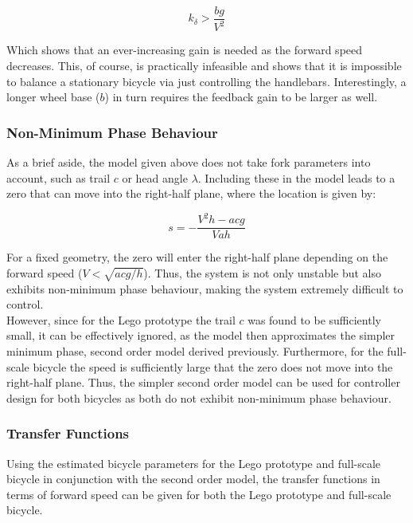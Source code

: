 \begin{equation}
k_{\delta} > \frac{b g}{V^2}
\label{eq:minGain}
\end{equation}

Which shows that an ever-increasing gain is needed as the forward speed decreases. This, of course, is practically infeasible and shows that it is impossible to balance a stationary bicycle via just controlling the handlebars. Interestingly, a longer wheel base ($b$) in turn requires the feedback gain to be larger as well.

\subsubsection{Non-Minimum Phase Behaviour}
As a brief aside, the model given above does not take fork parameters into account, such as trail $c$ or head angle $\lambda$. Including these in the model leads to a zero that can move into the right-half plane, where the location is given by:

\begin{equation*}
s = - \frac{V^2h-acg}{Vah}
\end{equation*}

For a fixed geometry, the zero will enter the right-half plane depending on the forward speed ($V<\sqrt{acg/h}$). Thus, the system is not only unstable but also exhibits non-minimum phase behaviour, making the system extremely difficult to control. \\

However, since for the Lego prototype the trail $c$ was found to be sufficiently small, it can be effectively ignored, as the model then approximates the simpler minimum phase, second order model derived previously. Furthermore, for the full-scale bicycle the speed is sufficiently large that the zero does not move into the right-half plane. Thus, the simpler second order model can be used for controller design for both bicycles as both do not exhibit non-minimum phase behaviour.

\subsubsection{Transfer Functions}
Using the estimated bicycle parameters for the Lego prototype and full-scale bicycle in conjunction with the second order model, the transfer functions in terms of forward speed can be given for both the Lego prototype and full-scale bicycle. \\

